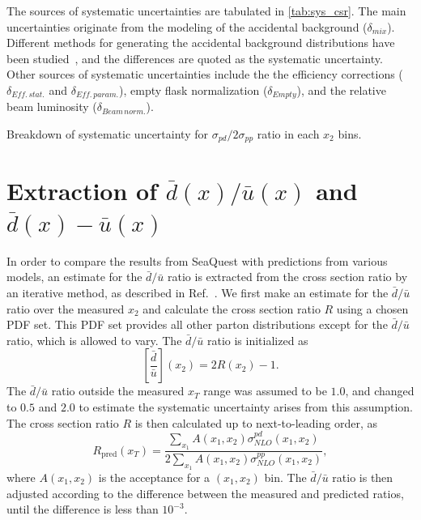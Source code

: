 \documentclass[reprint,aps,unsortedaddress,superscriptaddress,prl,floatfix,showpacs,linenumbers,final]{revtex4-2}
\begin{document}
The sources of systematic uncertainties are tabulated in \cref{tab:sys_csr}.
The main uncertainties originate from the modeling of the accidental background ($\delta_{mix}$). 
Different methods for generating the accidental background distributions have been studied~\cite{pate2023},
and the differences are quoted as the systematic uncertainty.
Other sources of systematic uncertainties include the the efficiency corrections ($\delta_{Eff.\,stat.}$ and $\delta_{Eff.\,param.}$),
empty flask normalization ($\delta_{Empty}$), and the relative beam luminosity ($\delta_{Beam\,norm.}$).
\begin{table}
	\centering
	\caption{Breakdown of systematic uncertainty for $\sigma_{pd}/2\sigma_{pp}$ ratio in each $x_2$ bins.}
	\label{tab:sys_csr}
	\begin{adjustbox}{max width=\linewidth}
		
	\end{adjustbox}
\end{table}

\section{Extraction of \texorpdfstring{$\bar{d}\left(x\right)/\bar{u}\left(x\right)$}{dbar(x)/ubar(x)}
  and \texorpdfstring{$\bar{d}\left(x\right)-\bar{u}\left(x\right)$}{dbar(x)-ubar(x)}}
\label{sec:extraction}
In order to compare the results from SeaQuest with predictions from various models,
an estimate for the $\bar{d}/\bar{u}$ ratio is extracted from the cross section ratio by
an iterative method, as described in Ref.~\cite{dove2021}.
We first make an estimate for the $\bar{d}/\bar{u}$ ratio over the measured $x_2$
and calculate the cross section ratio $R$ using a chosen PDF set.
This PDF set provides all other parton distributions except for the $\bar{d}/\bar{u}$ ratio,
which is allowed to vary. The $\bar{d}/\bar{u}$ ratio is initialized as
\begin{equation}
	\left[\frac{\bar{d}}{\bar{u}}\right]\left(x_2\right) = 2R\left(x_2\right)-1.
\end{equation}
The $\bar{d}/\bar{u}$ ratio outside the measured $x_T$ range was assumed to be $1.0$,
and changed to $0.5$ and $2.0$ to estimate the systematic uncertainty arises from this assumption.
The cross section ratio $R$ is then calculated up to next-to-leading order, as
\begin{equation}
	R_{\mathrm{pred}}\left(x_T\right)  = \frac{\sum_{x_1} A\left(x_1, x_2\right)\sigma^{pd}_{NLO}\left(x_1, x_2\right)}{2\sum_{x_1} A\left(x_1, x_2\right)\sigma^{pp}_{NLO}\left(x_1, x_2\right)},
\end{equation}
where $A\left(x_1,x_2\right)$ is the acceptance for a $\left(x_1, x_2\right)$ bin.
The $\bar{d}/\bar{u}$ ratio is then adjusted according to the difference between
the measured and predicted ratios, until the difference is less than $10^{-3}$.
\end{document}
